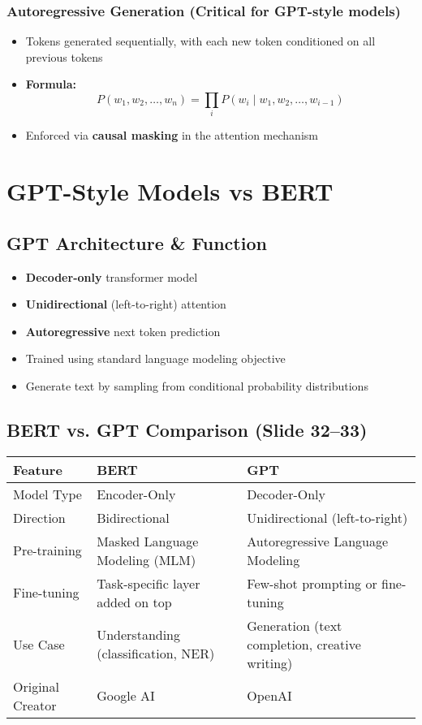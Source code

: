 \subsubsection*{Autoregressive Generation (Critical for GPT-style models)}
\begin{itemize}
    \item Tokens generated sequentially, with each new token conditioned on all previous tokens
    \item \textbf{Formula:}
    \[
    P(w_1, w_2, \dots, w_n) = \prod_{i} P(w_i \mid w_1, w_2, \dots, w_{i-1})
    \]
    \item Enforced via \textbf{causal masking} in the attention mechanism
\end{itemize}
\section{GPT-Style Models vs BERT}

\subsection*{GPT Architecture \& Function}
\begin{itemize}
    \item \textbf{Decoder-only} transformer model
    \item \textbf{Unidirectional} (left-to-right) attention
    \item \textbf{Autoregressive} next token prediction
    \item Trained using standard language modeling objective
    \item Generate text by sampling from conditional probability distributions
\end{itemize}

\subsection*{BERT vs. GPT Comparison (Slide 32--33)}
\begin{center}
\begin{tabular}{|l|l|l|}
\hline
\textbf{Feature} & \textbf{BERT} & \textbf{GPT} \\
\hline
Model Type & Encoder-Only & Decoder-Only \\
\hline
Direction & Bidirectional & Unidirectional (left-to-right) \\
\hline
Pre-training & Masked Language Modeling (MLM) & Autoregressive Language Modeling \\
\hline
Fine-tuning & Task-specific layer added on top & Few-shot prompting or fine-tuning \\
\hline
Use Case & Understanding (classification, NER) & Generation (text completion, creative writing) \\
\hline
Original Creator & Google AI & OpenAI \\
\hline
\end{tabular}
\end{center}


